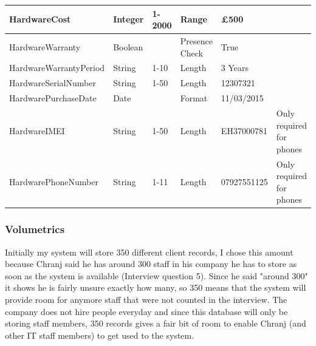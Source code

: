 \begin{center}
\begin{tabular}{|p{4cm}|p{1.3cm}|p{1.1cm}|p{1.7cm}|p{1.7cm}|p{2cm}|}
HardwareCost                       & Integer                                 & 1-2000                               & Range                                    & £500                  &                       \\ \hline
HardwareWarranty                    & Boolean                                 &                                      & Presence Check                           & True                  &                       \\ \hline
HardwareWarrantyPeriod              & String                                  & 1-10                                 & Length                                   & 3 Years               &                       \\ \hline
HardwareSerialNumber                & String                                  & 1-50                                 & Length                                   & 12307321              &                       \\ \hline
HardwarePurchaseDate                & Date                                  &                                  & Format                                   & 11/03/2015              &                       \\ \hline
HardwareIMEI                & String                                  &          1-50                        & Length                                   & EH37000781               & Only required for phones                      \\ \hline
HardwarePhoneNumber                & String                                  &1-11                                  & Length                                   & 07927551125              &   Only required for phones                      \\ \hline
\end{tabular}
\end{center}

\subsubsection{Volumetrics}

Initially my system will store 350 different client records, I chose this amount because Chranj said he has around 300 staff in his company he has to store as soon as the system is available (Interview question 5). Since he said "around 300" it shows he is fairly unsure exactly how many, so 350 means that the system will provide room for anymore staff that were not counted in the interview. The company does not hire people everyday and since this database will only be storing staff members, 350 records gives a fair bit of room to enable Chranj (and other IT staff members) to get used to the system.

